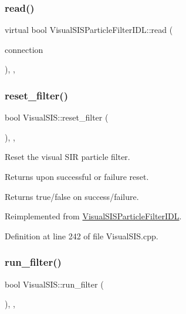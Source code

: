 \subsubsection{\texorpdfstring{read()}{read()}}
{\footnotesize\ttfamily virtual bool Visual\+S\+I\+S\+Particle\+Filter\+I\+D\+L\+::read (\begin{DoxyParamCaption}\item[{yarp\+::os\+::\+Connection\+Reader \&}]{connection }\end{DoxyParamCaption})\hspace{0.3cm}{\ttfamily [override]}, {\ttfamily [virtual]}, {\ttfamily [inherited]}}

\mbox{\label{classVisualSIS_a974ca828135835ccb4a2c3b7635b2aea}} 
\subsubsection{\texorpdfstring{reset\+\_\+filter()}{reset\_filter()}}
{\footnotesize\ttfamily bool Visual\+S\+I\+S\+::reset\+\_\+filter (\begin{DoxyParamCaption}{ }\end{DoxyParamCaption})\hspace{0.3cm}{\ttfamily [override]}, {\ttfamily [protected]}, {\ttfamily [virtual]}}



Reset the visual S\+IR particle filter. 

Returns upon successful or failure reset. \begin{DoxyReturn}{Returns}
true/false on success/failure. 
\end{DoxyReturn}


Reimplemented from \hyperlink{classVisualSISParticleFilterIDL_ad6047accd0fe743bdbd158cb9b6fc11b}{Visual\+S\+I\+S\+Particle\+Filter\+I\+DL}.



Definition at line 242 of file Visual\+S\+I\+S.\+cpp.

\mbox{\label{classVisualSIS_aa8ad54a90c9f1f6ca673d8d61721b7be}} 
\subsubsection{\texorpdfstring{run\+\_\+filter()}{run\_filter()}}
{\footnotesize\ttfamily bool Visual\+S\+I\+S\+::run\+\_\+filter (\begin{DoxyParamCaption}{ }\end{DoxyParamCaption})\hspace{0.3cm}{\ttfamily [override]}, {\ttfamily [protected]}, {\ttfamily [virtual]}}



